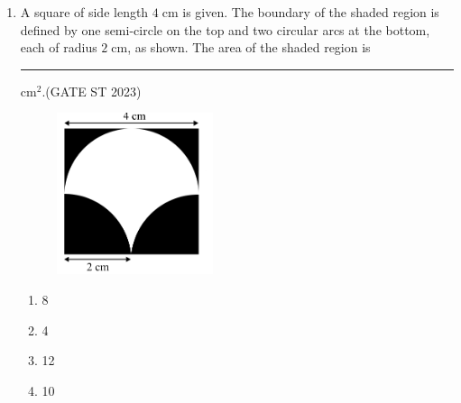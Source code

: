 \documentclass[journal]{IEEEtran}
\begin{document}
\begin{enumerate}[label=\textbf{Q.\arabic*.}, start=1, align=left, itemsep=2em]
\item A square of side length $4\;\mathrm{cm}$ is given. The boundary of the shaded region is defined by one semi-circle on the top and two circular arcs at the bottom, each of radius $2\;\mathrm{cm}$, as shown.
The area of the shaded region is \rule{3cm}{0.1pt} cm$^2$.\hfill(GATE ST 2023)
    \begin{figure}[H]
        \centering
        \includegraphics[width=0.5\columnwidth]{figs/Q.10image.png}
        \label{fig:placeholder}
    \end{figure}
\begin{enumerate}
    \item 8
    \item 4
    \item 12
    \item 10
\end{enumerate}

\end{enumerate}
\end{document}
